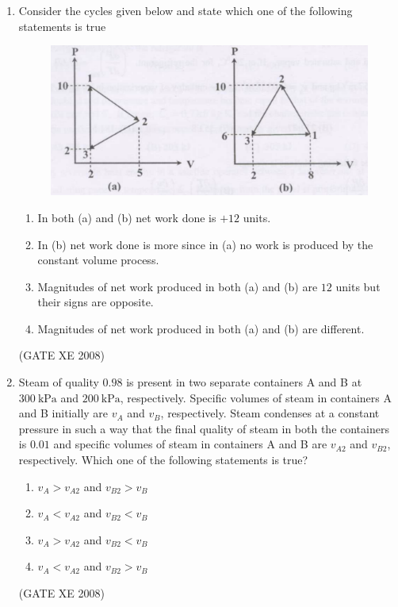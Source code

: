 \documentclass[12pt]{article}
\begin{document}
\begin{enumerate}
\item Consider the cycles given below and state which one of the following statements is true

    \begin{figure}[H]
    \centering
    \includegraphics[width=0.5\columnwidth]{figs/ass1_g_q13.png}
    \caption{}
    \end{figure}

\begin{enumerate}
\item  In both (a) and (b) net work done is $+12$ units.
\item  In (b) net work done is more since in (a) no work is produced by the constant volume process.
\item  Magnitudes of net work produced in both (a) and (b) are $12$ units but their signs are opposite.
\item  Magnitudes of net work produced in both (a) and (b) are different.  
\end{enumerate}

(GATE XE 2008)

\item Steam of quality $0.98$ is present in two separate containers A and B at $300\ \mathrm{kPa}$ and $200\ \mathrm{kPa}$, respectively. Specific volumes of steam in containers A and B initially are $v_A$ and $v_B$, respectively. Steam condenses at a constant pressure in such a way that the final quality of steam in both the containers is $0.01$ and specific volumes of steam in containers A and B are $v_{A2}$ and $v_{B2}$, respectively. Which one of the following statements is true?  

\begin{enumerate}
\item  $v_A > v_{A2}$ and $v_{B2} > v_B$  
\item  $v_A < v_{A2}$ and $v_{B2} < v_B$  
\item  $v_A > v_{A2}$ and $v_{B2} < v_B$  
\item  $v_A < v_{A2}$ and $v_{B2} > v_B$  
\end{enumerate}

(GATE XE 2008)


\end{enumerate}
\end{document}
